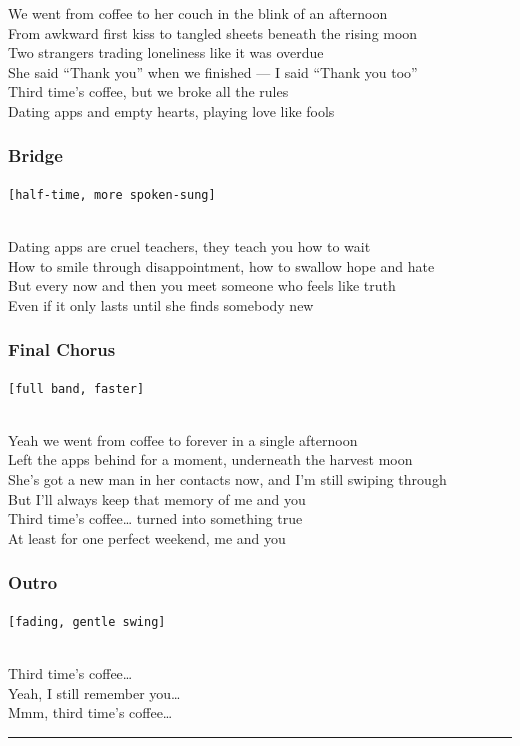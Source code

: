 We went from coffee to her couch in the blink of an afternoon\\
From awkward first kiss to tangled sheets beneath the rising moon\\
Two strangers trading loneliness like it was overdue\\
She said ``Thank you'' when we finished --- I said ``Thank you too''\\
Third time's coffee, but we broke all the rules\\
Dating apps and empty hearts, playing love like fools

\subsubsection{Bridge}\label{bridge-33}

\texttt{{[}half-time,\ more\ spoken-sung{]}}\strut \\
Dating apps are cruel teachers, they teach you how to wait\\
How to smile through disappointment, how to swallow hope and hate\\
But every now and then you meet someone who feels like truth\\
Even if it only lasts until she finds somebody new

\subsubsection{Final Chorus}\label{final-chorus-10}

\texttt{{[}full\ band,\ faster{]}}\strut \\
Yeah we went from coffee to forever in a single afternoon\\
Left the apps behind for a moment, underneath the harvest moon\\
She's got a new man in her contacts now, and I'm still swiping through\\
But I'll always keep that memory of me and you\\
Third time's coffee\ldots{} turned into something true\\
At least for one perfect weekend, me and you

\subsubsection{Outro}\label{outro-10}

\texttt{{[}fading,\ gentle\ swing{]}}\strut \\
Third time's coffee\ldots{}\\
Yeah, I still remember you\ldots{}\\
Mmm, third time's coffee\ldots{}

\begin{center}\rule{0.5\linewidth}{0.5pt}\end{center}
